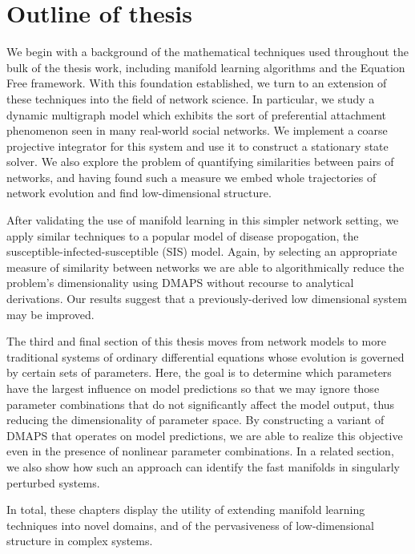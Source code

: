 \section{Outline of thesis}

We begin with a background of the mathematical techniques used
throughout the bulk of the thesis work, including manifold learning
algorithms and the Equation Free framework. With this foundation
established, we turn to an extension of these techniques into the
field of network science. In particular, we study a dynamic multigraph
model which exhibits the sort of preferential attachment phenomenon
seen in many real-world social networks. We implement a coarse
projective integrator for this system and use it to construct a
stationary state solver. We also explore the problem of quantifying
similarities between pairs of networks, and having found such a
measure we embed whole trajectories of network evolution and find
low-dimensional structure. 

After validating the use of manifold learning in this simpler network
setting, we apply similar techniques to a popular model of disease
propogation, the susceptible-infected-susceptible (SIS) model. Again,
by selecting an appropriate measure of similarity between networks we
are able to algorithmically reduce the problem's dimensionality using
DMAPS without recourse to analytical derivations. Our results suggest
that a previously-derived low dimensional system may be improved.

The third and final section of this thesis moves from network models
to more traditional systems of ordinary differential equations whose
evolution is governed by certain sets of parameters. Here, the goal is
to determine which parameters have the largest influence on model
predictions so that we may ignore those parameter combinations that do
not significantly affect the model output, thus reducing the
dimensionality of parameter space. By constructing a variant of DMAPS
that operates on model predictions, we are able to realize this
objective even in the presence of nonlinear parameter combinations. In
a related section, we also show how such an approach can identify the
fast manifolds in singularly perturbed systems.

In total, these chapters display the utility of extending manifold
learning techniques into novel domains, and of the pervasiveness of
low-dimensional structure in complex
systems.


